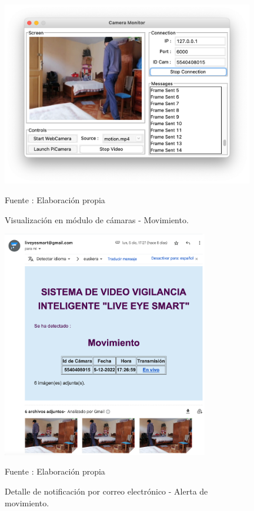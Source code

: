 \begin{figure}[H]
    \begin{center}
        \includegraphics[width=11cm]{img/capitulo_6/motion.png}
    \end{center}
    \begin{center}
        \caption{Visualización en módulo de cámaras - Movimiento.}
        Fuente : Elaboración propia
    \end{center}
\end{figure}

\begin{figure}[H]
    \begin{center}
        \includegraphics[width=9cm]{img/capitulo_6/mail_motion.png}
    \end{center}
    \begin{center}
        \caption{Detalle de notificación por correo electrónico - Alerta de movimiento.}
        Fuente : Elaboración propia
    \end{center}
\end{figure}

